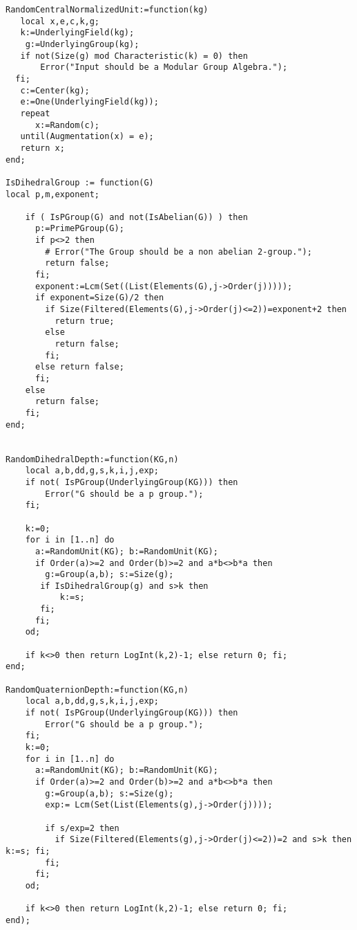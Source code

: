 \begin{lstlisting}[label=dod, frame=none]
RandomCentralNormalizedUnit:=function(kg)
   local x,e,c,k,g;
   k:=UnderlyingField(kg);
 	g:=UnderlyingGroup(kg);
   if not(Size(g) mod Characteristic(k) = 0) then
 	   Error("Input should be a Modular Group Algebra.");
  fi;
   c:=Center(kg);
   e:=One(UnderlyingField(kg));
   repeat
      x:=Random(c);
   until(Augmentation(x) = e);
   return x;
end;

IsDihedralGroup := function(G)
local p,m,exponent;

    if ( IsPGroup(G) and not(IsAbelian(G)) ) then
      p:=PrimePGroup(G);
      if p<>2 then
        # Error("The Group should be a non abelian 2-group.");
        return false;
      fi;
      exponent:=Lcm(Set((List(Elements(G),j->Order(j)))));
      if exponent=Size(G)/2 then
        if Size(Filtered(Elements(G),j->Order(j)<=2))=exponent+2 then
          return true;
        else
          return false;
        fi;
      else return false;
      fi;
    else
      return false;
    fi;
end;


RandomDihedralDepth:=function(KG,n)
    local a,b,dd,g,s,k,i,j,exp;
    if not( IsPGroup(UnderlyingGroup(KG))) then
        Error("G should be a p group.");
    fi;

    k:=0;
    for i in [1..n] do
      a:=RandomUnit(KG); b:=RandomUnit(KG);
      if Order(a)>=2 and Order(b)>=2 and a*b<>b*a then
        g:=Group(a,b); s:=Size(g);
       if IsDihedralGroup(g) and s>k then
           k:=s;
       fi;
      fi;
    od;

    if k<>0 then return LogInt(k,2)-1; else return 0; fi;
end;

RandomQuaternionDepth:=function(KG,n)
    local a,b,dd,g,s,k,i,j,exp;
    if not( IsPGroup(UnderlyingGroup(KG))) then
        Error("G should be a p group.");
    fi;
    k:=0;
    for i in [1..n] do
      a:=RandomUnit(KG); b:=RandomUnit(KG);
      if Order(a)>=2 and Order(b)>=2 and a*b<>b*a then
        g:=Group(a,b); s:=Size(g);
        exp:= Lcm(Set(List(Elements(g),j->Order(j))));

        if s/exp=2 then
          if Size(Filtered(Elements(g),j->Order(j)<=2))=2 and s>k then k:=s; fi;
        fi;
      fi;
    od;

    if k<>0 then return LogInt(k,2)-1; else return 0; fi;
end);

\end{lstlisting}

